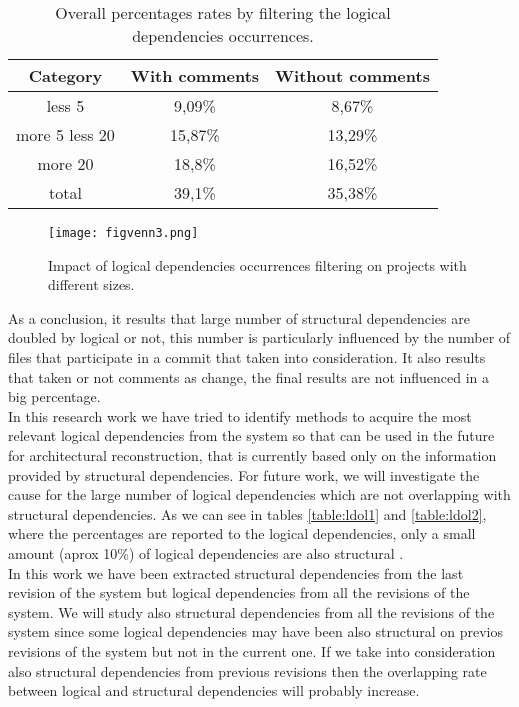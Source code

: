 \begin{table}
  \centering
  \begin{tabular}{@{}c||cc@{}}
    \toprule
       Category & With comments & Without comments  \\
    \midrule
less 5	&	9,09\% &	8,67\%	\\
more 5 less 20	&	15,87\% &	13,29\%\\
more 20	&	18,8\%	&	16,52\%\\
total &39,1\% & 35,38\% \\
    \bottomrule
  \end{tabular}
  \caption{Overall percentages rates by filtering the logical dependencies occurrences. }
   \label{table:14}
\end{table}


\begin{figure}[h]
\centering
\texttt{[image: figvenn3.png]}
\caption{Impact of logical dependencies occurrences filtering on projects with different sizes.}
\label{fig:figvenn3}
\end{figure}


As a conclusion, it results that large number of structural dependencies are doubled by logical or not, this number is particularly influenced by the number of files that participate in a commit that taken into consideration. It also results that taken or not comments as change, the final results are not influenced in a big percentage. \\ 
\tab In this research work we have tried to identify methods to acquire the most relevant logical dependencies from the system so that can be used in the future for architectural reconstruction, that is currently based only on the information provided by structural dependencies.
\tab For future work, we will investigate the cause for the large number of logical dependencies which are not overlapping with structural dependencies. As we can see in tables \ref{table:ldol1} and \ref{table:ldol2}, where the percentages are reported to the logical dependencies, only a small amount (aprox 10\%) of logical dependencies are also structural .\\ In this work we have been extracted structural dependencies from the last revision of the system but logical dependencies from all the revisions of the system. We will study also structural dependencies from all the revisions of the system since some logical dependencies may have been also structural on previos revisions of the system but not in the current one. If we take into consideration also structural dependencies from previous revisions then the overlapping rate between logical and structural dependencies will probably increase.\\

